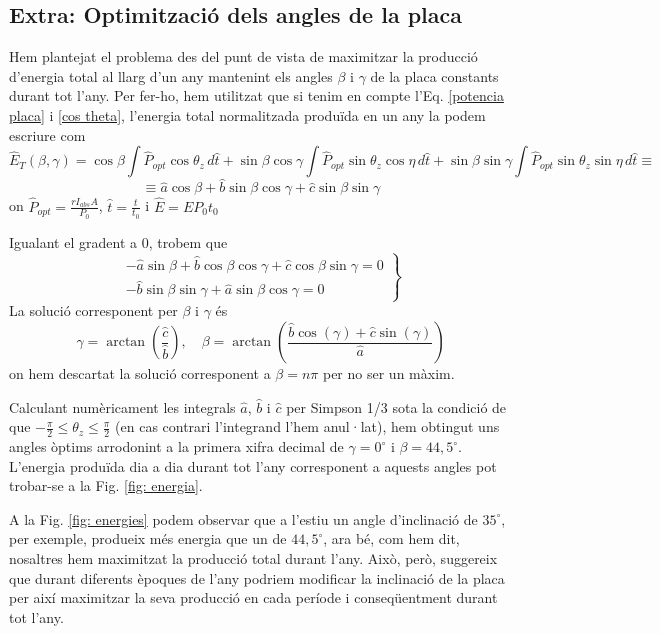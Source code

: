 \documentclass[11pt]{article}
\begin{document}
\subsection{Extra: Optimització dels angles de la placa}

Hem plantejat el problema des del punt de vista de maximitzar la producció d'energia total al llarg d'un any mantenint els angles $\beta$ i $\gamma$ de la placa constants durant tot l'any. Per fer-ho, hem utilitzat que si tenim en compte l'Eq. \ref{potencia placa} i \ref{cos theta}, l'energia total normalitzada produïda en un any la podem escriure com
\[
\hat{E}_T(\beta, \gamma) = \cos \beta \int \hat{P}_{opt} \cos \theta_{z} \, d\hat{t} + \sin \beta \cos \gamma \int \hat{P}_{opt} \sin \theta_{z} \cos \eta \, d\hat{t} + \sin \beta \sin \gamma \int \hat{P}_{opt} \sin \theta_{z} \sin \eta \, d\hat{t} \equiv
\]
\[
\equiv \hat{a}\cos \beta
+ \hat{b}\sin \beta \cos \gamma
+ \hat{c}\sin \beta \sin \gamma
\]
on $\hat{P}_{opt}=\frac{r I_{abs} A}{P_0}$, $\hat{t}=\frac{t}{t_0}$ i $\hat{E}=E P_0 t_0$

Igualant el gradent a 0, trobem que
\[
\left.
\begin{aligned}
-\hat{a}\sin \beta + \hat{b}\cos \beta \cos \gamma + \hat{c}\cos \beta \sin \gamma = 0 \\
-\hat{b}\sin \beta \sin \gamma + \hat{a}\sin \beta \cos \gamma = 0
\end{aligned}
\right\}
\]
La solució corresponent per $\beta$ i $\gamma$ és
\[
\gamma = \arctan\left(\frac{\hat{c}}{\hat{b}}\right), \quad \beta = \arctan\left(\frac{\hat{b} \cos(\gamma) + \hat{c} \sin(\gamma)}{\hat{a}}\right)
\]
on hem descartat la solució corresponent a $\beta=n\pi$ per no ser un màxim.

Calculant numèricament les integrals $\hat{a}$, $\hat{b}$ i $\hat{c}$ per Simpson 1/3 sota la condició de que $-\frac{\pi}{2} \leq \theta_z \leq \frac{\pi}{2}$ (en cas contrari l'integrand l'hem anul·lat), hem obtingut uns angles òptims arrodonint a la primera xifra decimal de $\gamma=0^\circ$ i $\beta=44,5^\circ$. L'energia produïda dia a dia durant tot l'any corresponent a aquests angles pot trobar-se a la Fig. \ref{fig: energia}. 

A la Fig. \ref{fig: energies} podem observar que a l'estiu un angle d'inclinació de $35^\circ$, per exemple, produeix més energia que un de $44,5^\circ$, ara bé, com hem dit, nosaltres hem maximitzat la producció total durant l'any. Això, però, suggereix que durant diferents èpoques de l'any podriem modificar la inclinació de la placa per així maximitzar la seva producció en cada període i conseqüentment durant tot l'any.
\end{document}
